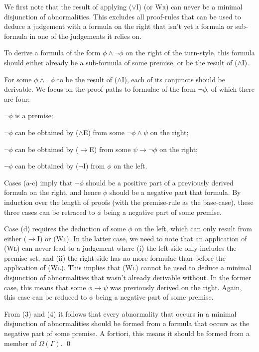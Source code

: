 \documentclass[]{article}
\begin{document}
\begin{enumerate*}
    \item We first note that the result of applying ($\vee$I) (or \textsc{Wr}) can never be a minimal disjunction of abnormalities. This excludes all proof-rules that can be used to deduce a judgement with a formula on the right that isn't yet a formula or sub-formula in one of the judgements it relies on.
    \item To derive a formula of the form $\phi \wedge \neg \phi$ on the right of the turn-style, this formula should either already be a sub-formula of some premise, or be the result of ($\wedge$I).
    \item For some $\phi \wedge \neg \phi$ to be the result of ($\wedge$I), each of its conjuncts should be derivable. We focus on the proof-paths to formulae of the form $\neg \phi$, of which there are four:
        \begin{enumerate*}
            \item $\neg \phi$ is a premise;
            \item $\neg \phi$ can be obtained by ($\wedge$E) from some $\neg \phi \wedge \psi$ on the right;
            \item $\neg \phi$ can be obtained by ($\to$E) from some $\psi \to \neg \phi$ on the right;
            \item $\neg \phi$ can be obtained by ($\neg$I) from $\phi$ on the left.
        \end{enumerate*}
        Cases (a-c) imply that $\neg \phi$ should be a positive part of a previously derived formula on the right, and hence $\phi$ should be a negative part that formula. By induction over the length of proofs (with the premise-rule as the base-case), these three cases can be retraced to $\phi$ being a negative part of some premise.
    \item Case (d) requires the deduction of some $\phi$ on the left, which can only result from either ($\to$I) or (\textsc{Wl}). In the latter case, we need to note that an application of (\textsc{Wl}) can never lead to a judgement where (i) the left-side only includes the premise-set, and (ii) the right-side has no more formulae than before the application of (\textsc{Wl}). This implies that (\textsc{Wl}) cannot be used to deduce a minimal disjunction of abnormalities that wasn't already derivable without. In the former case, this means that some $\phi \to \psi$ was previously derived on the right. Again, this case can be reduced to $\phi$ being a negative part of some premise. 
\end{enumerate*}
From (3) and (4) it follows that every abnormality that occurs in a minimal disjunction of abnormalities should be formed from a formula that occurs as the negative part of some premise. A fortiori, this means it should be formed from a member of $\Omega(\Gamma)$.
\qed
\end{document}
